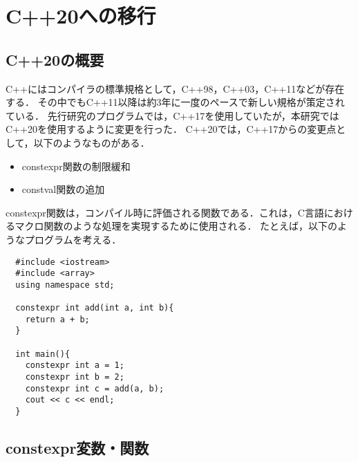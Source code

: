﻿%

\chapter{C++20への移行}\label{chapter:付録A}
\section{C++20の概要}
C++にはコンパイラの標準規格として，C++98，C++03，C++11などが存在する．
その中でもC++11以降は約3年に一度のペースで新しい規格が策定されている．
先行研究のプログラムでは，C++17を使用していたが，本研究ではC++20を使用するように変更を行った．
C++20では，C++17からの変更点として，以下のようなものがある．
\begin{itemize}
  \item constexpr関数の制限緩和
  \item constval関数の追加
\end{itemize}
constexpr関数は，コンパイル時に評価される関数である．これは，C言語におけるマクロ関数のような処理を実現するために使用される．
たとえば，以下のようなプログラムを考える．
\begin{verbatim}
  #include <iostream>
  #include <array>
  using namespace std;

  constexpr int add(int a, int b){
    return a + b;
  }

  int main(){
    constexpr int a = 1;
    constexpr int b = 2;
    constexpr int c = add(a, b);
    cout << c << endl;
  }
\end{verbatim}

\section{constexpr変数・関数}
